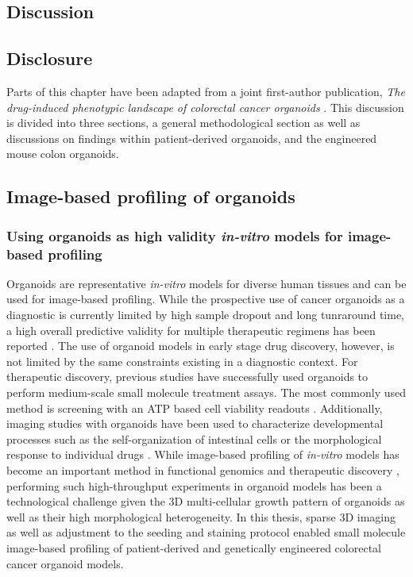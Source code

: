 \begin{flushleft}

\chapter{Discussion}

\section{Disclosure}
Parts of this chapter have been adapted from a joint first-author publication, \textit{The drug-induced phenotypic landscape of colorectal cancer organoids} \citep{betgeDruginducedPhenotypicLandscape2022}. This discussion is divided into three sections, a general methodological section as well as discussions on findings within patient-derived organoids, and the engineered mouse colon organoids.

\section{Image-based profiling of organoids}

\subsection{Using organoids as high validity \textit{in-vitro} models for image-based profiling}

Organoids are representative \textit{in-vitro} models for diverse human tissues and can be used for image-based profiling. While the prospective use of cancer organoids as a diagnostic is currently limited by high sample dropout and long tunraround time, a high overall predictive validity for multiple therapeutic regimens has been reported \citep{ooftProspectiveExperimentalTreatment2021}. The use of organoid models in early stage drug discovery, however, is not limited by the same constraints existing in a diagnostic context. For therapeutic discovery, previous studies have successfully used organoids to perform medium-scale small molecule treatment assays. The most commonly used method is screening with an ATP based cell viability readouts \citep{vandeweteringProspectiveDerivationLiving2015}. Additionally, imaging studies with organoids have been used to characterize developmental processes such as the self-organization of intestinal cells \citep{lukoninPhenotypicLandscapeIntestinal2020, boehnkeAssayEstablishmentValidation2016a} or the morphological response to individual drugs \citep{Badder2020-au, serraSelforganizationSymmetryBreaking2019}. While image-based profiling of \textit{in-vitro} models has become an important method in functional genomics and therapeutic discovery \citep{carpenterImagebasedChemicalScreening2007}, performing such high-throughput experiments in organoid models has been a technological challenge given the 3D multi-cellular growth pattern of organoids as well as their high morphological heterogeneity. In this thesis, sparse 3D imaging as well as adjustment to the seeding and staining protocol enabled small molecule image-based profiling of patient-derived and genetically engineered colorectal cancer organoid models. 
\bigbreak



\end{flushleft}
